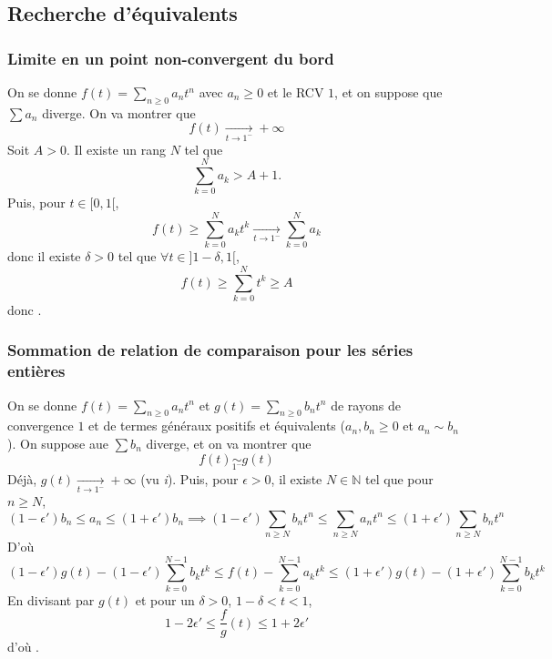 \subsection{Recherche d'équivalents}

\subsubsection{Limite en un point non-convergent du bord}

On se donne $f(t)=\sum_{n\geq 0}a_nt^n$ avec $a_n\geq 0$ et le RCV $1$, et on suppose que $\sum a_n$ diverge. On va montrer que \[
    f(t)\xrightarrow[t\to1^-]{}+\infty
\]
Soit $A>0$. Il existe un rang $N$ tel que \[
    \sum_{k=0}^Na_k>A+1.
\]
Puis, pour $t\in [0, 1[$, \[
    f(t)\geq \sum_{k=0}^Na_kt^k\xrightarrow[t\to1^-]{}\sum_{k=0}^Na_k
\]
donc il existe $\delta>0$ tel que $\forall t\in ]1-\delta, 1[$, \[
    f(t)\geq \sum_{k=0}^Nt^k\geq A
\]
donc \conc.

\subsubsection{Sommation de relation de comparaison pour les séries entières}

On se donne $f(t)=\sum_{n\geq 0}a_nt^n$ et $g(t)=\sum_{n\geq 0}b_nt^n$ de rayons de convergence $1$ et de termes généraux positifs et équivalents ($a_n,b_n\geq 0$ et $a_n\sim b_n$). On suppose aue $\sum b_n$ diverge, et on va montrer que \[
    f(t)\underset{1^-}\sim g(t)
\]
Déjà, $g(t)\xrightarrow[t\to1^-]{}+\infty$ (vu \emph i). Puis, pour $\epsilon>0$, il existe $N\in\mathbb N$ tel que pour $n\geq N$, \[
    (1-\epsilon')b_n\leq a_n\leq (1+\epsilon')b_n \implies (1-\epsilon')\sum_{n\geq N}b_nt^n\leq \sum_{n\geq N}a_nt^n\leq(1+\epsilon')\sum_{n\geq N}b_nt^n
\]
D'où \[
    (1-\epsilon')g(t)-(1-\epsilon')\sum_{k=0}^{N-1}b_kt^k\leq f(t)-\sum_{k=0}^{N-1}a_kt^k\leq (1+\epsilon')g(t)-(1+\epsilon')\sum_{k=0}^{N-1}b_kt^k
\]
En divisant par $g(t)$ et pour un $\delta>0$, $1-\delta<t<1$, \[
    1-2\epsilon'\leq \frac fg(t)\leq 1+2\epsilon'
\]
d'où \conc.
